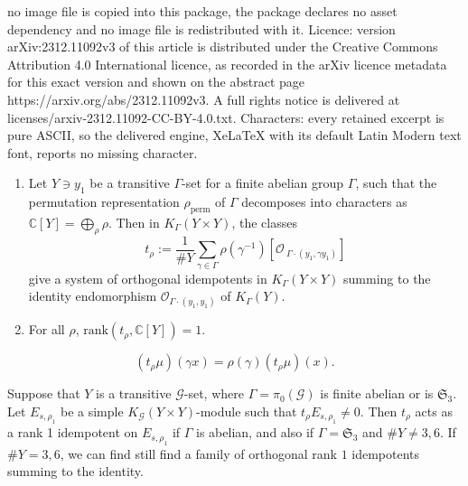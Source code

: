 \documentclass[10pt,a4paper]{amsart}
\newcommand{\C}{\mathbb{C}}
\newcommand{\Oo}{\mathcal{O}}
\newcommand{\Sn}{\mathfrak{S}}
\newcommand{\Zz}{\mathcal{G}}
\newcommand{\rank}{\mathrm{rank}}
\begin{document}
no image file is copied into this package, the package declares no asset dependency and no image file is redistributed with it. Licence: version arXiv:2312.11092v3 of this article is distributed under the Creative Commons Attribution 4.0 International licence, as recorded in the arXiv licence metadata for this exact version and shown on the abstract page https://arxiv.org/abs/2312.11092v3. A full rights notice is delivered at licenses/arxiv-2312.11092-CC-BY-4.0.txt. Characters: every retained excerpt is pure ASCII, so the delivered engine, XeLaTeX with its default Latin Modern text font, reports no missing character.
\begin{lem}
\label{lem orthogonal idempotents for unextended set}
\begin{enumerate}
\item[(a)] 
Let $Y\owns y_1$ be a transitive $\Gamma$-set for a finite abelian group $\Gamma$, such that the permutation representation $\rho_{\mathrm{perm}}$ of $\Gamma$ decomposes into 
characters as $\C[Y]=\bigoplus_\rho\rho$. Then in $K_\Gamma(Y\times Y)$, the classes
%
\[
t_\rho:=\frac{1}{\# Y}\sum_{\gamma\in\Gamma}\rho(\gamma^{-1})[\Oo_{\
\Gamma\cdot (y_1,\gamma y_1)}]
\]
%
give a system of orthogonal idempotents in $K_\Gamma(Y\times Y)$
summing to the identity endomorphism $\Oo_{\Gamma\cdot(y_1,y_1)}$ of $K_\Gamma(Y)$.
%
\item[(b)]
For all $\rho$, $\rank(t_\rho, \C[Y])=1$.
\end{enumerate}
\end{lem}

\begin{equation}
\label{eqn trho mu transforms according to rho}
(t_{\rho}\mu)(\gamma x)=\rho(\gamma)(t_{\rho}\mu)(x).
\end{equation}

\begin{lem}
\label{lem trho act with rank 1 or 0}
Suppose that $Y$ is a transitive $\Zz$-set, where $\Gamma=\pi_0(\Zz)$ is finite abelian or is $\Sn_3$. Let 
$E_{s,\rho_1}$ be a simple $K_\Zz(Y\times Y)$-module such that $t_{\rho}E_{s,\rho_1}\neq 0$. Then $t_\rho$ acts 
as a rank 1 idempotent on $E_{s,\rho_1}$ if $\Gamma$ is abelian, and also if $\Gamma=\Sn_3$ and $\#Y\neq 3, 6$. If $\# Y=3,6$, we can find still find a family of orthogonal rank $1$ idempotents summing to the identity.
\end{lem}
\end{document}
